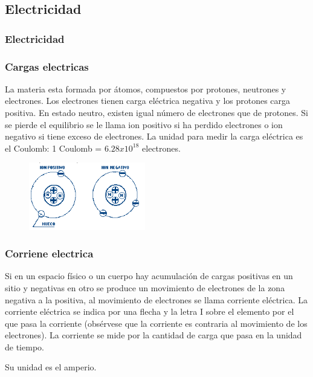 \documentclass{beamer}
\begin{document}
\subsection{Electricidad}
\begin{frame}
\frametitle{Electricidad}

\end{frame}

\begin{frame}
\frametitle{Cargas electricas}

La materia esta formada por átomos, compuestos por protones, neutrones y electrones. Los electrones tienen carga eléctrica negativa y los protones carga positiva. En estado neutro, existen igual número de electrones que de protones. Si se pierde el equilibrio se le llama ion positivo si ha perdido electrones o ion negativo si tiene exceso de electrones. La unidad para medir la carga eléctrica es el Coulomb:
1 Coulomb = $6.28x10^{18}$ electrones.

\begin{figure}[!h]
\centering
\includegraphics[width=2in]{cargas}
\end{figure}

\end{frame}

\begin{frame}
\frametitle{Corriene electrica}

Si en un espacio físico o un cuerpo hay acumulación de cargas positivas en un sitio y negativas en otro se produce un movimiento de electrones de la zona negativa a la positiva, al movimiento de electrones se llama corriente eléctrica. La corriente eléctrica se indica por una flecha y la letra I sobre el elemento por el que pasa la corriente (obsérvese que la corriente es contraria al movimiento de los electrones). La corriente se mide por la cantidad de carga que pasa en la unidad de tiempo.

Su unidad es el amperio.

\end{frame}
\end{document}
